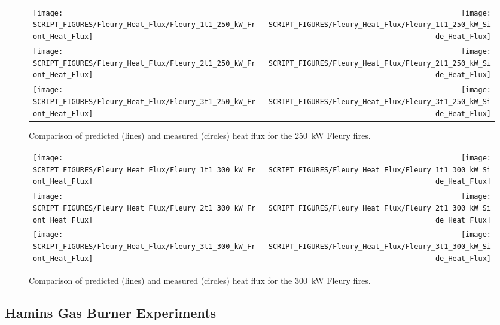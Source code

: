 \begin{figure}[p]
\begin{tabular*}{\textwidth}{l@{\extracolsep{\fill}}r}
\texttt{[image: SCRIPT\_FIGURES/Fleury\_Heat\_Flux/Fleury\_1t1\_250\_kW\_Front\_Heat\_Flux]} &
\texttt{[image: SCRIPT\_FIGURES/Fleury\_Heat\_Flux/Fleury\_1t1\_250\_kW\_Side\_Heat\_Flux]} \\
\texttt{[image: SCRIPT\_FIGURES/Fleury\_Heat\_Flux/Fleury\_2t1\_250\_kW\_Front\_Heat\_Flux]} &
\texttt{[image: SCRIPT\_FIGURES/Fleury\_Heat\_Flux/Fleury\_2t1\_250\_kW\_Side\_Heat\_Flux]} \\
\texttt{[image: SCRIPT\_FIGURES/Fleury\_Heat\_Flux/Fleury\_3t1\_250\_kW\_Front\_Heat\_Flux]} &
\texttt{[image: SCRIPT\_FIGURES/Fleury\_Heat\_Flux/Fleury\_3t1\_250\_kW\_Side\_Heat\_Flux]}
\end{tabular*}
\label{Fleury_Heat_Flux_250_kW}
\caption[Fleury Heat Flux, 250 kW fires]
{Comparison of predicted (lines) and measured (circles) heat flux for the 250~kW Fleury fires.}
\end{figure}

\begin{figure}[p]
\begin{tabular*}{\textwidth}{l@{\extracolsep{\fill}}r}
\texttt{[image: SCRIPT\_FIGURES/Fleury\_Heat\_Flux/Fleury\_1t1\_300\_kW\_Front\_Heat\_Flux]} &
\texttt{[image: SCRIPT\_FIGURES/Fleury\_Heat\_Flux/Fleury\_1t1\_300\_kW\_Side\_Heat\_Flux]} \\
\texttt{[image: SCRIPT\_FIGURES/Fleury\_Heat\_Flux/Fleury\_2t1\_300\_kW\_Front\_Heat\_Flux]} &
\texttt{[image: SCRIPT\_FIGURES/Fleury\_Heat\_Flux/Fleury\_2t1\_300\_kW\_Side\_Heat\_Flux]} \\
\texttt{[image: SCRIPT\_FIGURES/Fleury\_Heat\_Flux/Fleury\_3t1\_300\_kW\_Front\_Heat\_Flux]} &
\texttt{[image: SCRIPT\_FIGURES/Fleury\_Heat\_Flux/Fleury\_3t1\_300\_kW\_Side\_Heat\_Flux]}
\end{tabular*}
\label{Fleury_Heat_Flux_300_kW}
\caption[Fleury Heat Flux, 300 kW fires]
{Comparison of predicted (lines) and measured (circles) heat flux for the 300~kW Fleury fires.}
\end{figure}

\clearpage

\subsection{Hamins Gas Burner Experiments}

